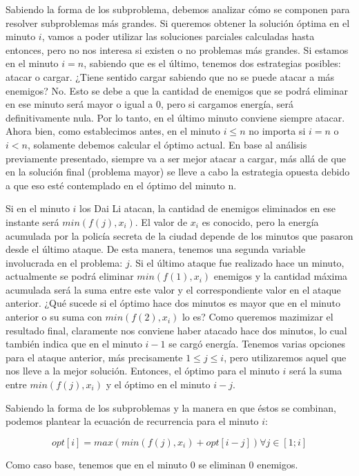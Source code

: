 \documentclass{article}
\begin{document}
Sabiendo la forma de los subproblema, debemos analizar cómo se componen para resolver subproblemas más grandes. Si queremos obtener la solución óptima en el minuto $i$, vamos a poder utilizar las soluciones parciales calculadas hasta entonces, pero no nos interesa si existen o no problemas más grandes. Si estamos en el minuto $i = n$, sabiendo que es el último, tenemos dos estrategias posibles: atacar o cargar. ¿Tiene sentido cargar sabiendo que no se puede atacar a más enemigos? No. Esto se debe a que la cantidad de enemigos que se podrá eliminar en ese minuto será  mayor o igual a 0, pero si cargamos energía, será definitivamente nula. Por lo tanto, en el último minuto conviene siempre atacar. Ahora bien, como establecimos antes, en el minuto $i \leq n$ no importa si $i = n$ o $i < n$, solamente debemos calcular el óptimo actual. En base al análisis previamente presentado, siempre va a ser mejor atacar a cargar, más allá de que en la solución final (problema mayor) se lleve a cabo la estrategia opuesta debido a que eso esté contemplado en el óptimo del minuto n. 

Si en el minuto $i$ los Dai Li atacan, la cantidad de enemigos eliminados en ese instante será $min(f(j), x_i)$. El valor de $x_i$ es conocido, pero la energía acumulada por la policía secreta de la ciudad depende de los minutos que pasaron desde el último ataque. De esta manera, tenemos una segunda variable involucrada en el problema: $j$. Si el último ataque fue realizado hace un minuto, actualmente se podrá eliminar $min(f(1), x_i)$ enemigos y la cantidad máxima acumulada será la suma entre este valor y el correspondiente valor en el ataque anterior. ¿Qué sucede si el óptimo hace dos minutos es mayor que en el minuto anterior o su suma con $min(f(2), x_i)$ lo es? Como queremos mazimizar el resultado final, claramente nos conviene haber atacado hace dos minutos, lo cual también indica que en el minuto $i - 1$ se cargó energía. Tenemos varias opciones para el ataque anterior, más precisamente $1 \leq j \leq i$, pero utilizaremos aquel que nos lleve a la mejor solución. Entonces, el óptimo para el minuto $i$ será la suma entre $min(f(j), x_i)$ y el óptimo en el minuto $i - j$.

Sabiendo la forma de los subproblemas y la manera en que éstos se combinan, podemos plantear la ecuación de recurrencia para el minuto $i$:

$$opt[i] = max(min(f(j), x_i) + opt[i - j]) \forall j \in [1; i]$$

Como caso base, tenemos que en el minuto 0 se eliminan 0 enemigos.
\end{document}
